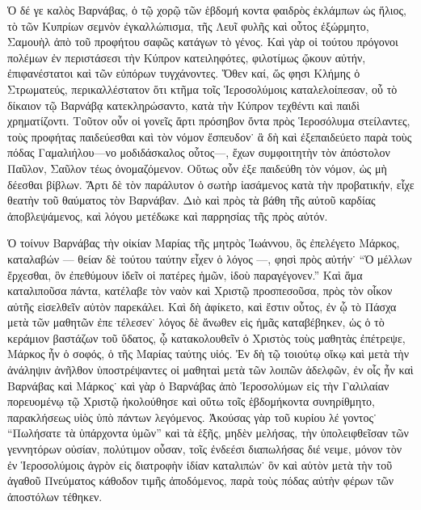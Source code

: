 Ὁ δέ γε καλὸς Βαρνάβας, ὁ τῷ χορῷ τῶν ἑβδομή%
κοντα φαιδρὸς ἐκλάμπων ὡς ἥλιος, τὸ τῶν Κυπρίων
σεμνὸν ἐγκαλλώπισμα, τῆς Λευῖ φυλῆς καὶ οὗτος
ἐξώρμητο, Σαμουὴλ ἀπὸ τοῦ προφήτου σαφῶς κατάγων
τὸ γένος. Καὶ γὰρ οἱ τούτου πρόγονοι πολέμων ἐν
περιστάσεσι τὴν Κύπρον κατειληφότες, φιλοτίμως ᾤκουν
αὐτήν, ἐπιφανέστατοι καὶ τῶν εὐπόρων τυγχάνοντες. Ὅθεν
καί, ὥς φησι Κλήμης ὁ Στρωματεύς, περικαλλέστατον
ὅτι κτῆμα τοῖς Ἱεροσολύμοις καταλελοίπεσαν, οὗ τὸ
δίκαιον τῷ Βαρνάβᾳ κατεκληρώσαντο, κατὰ τὴν Κύπρον
τεχθέντι καὶ παιδὶ χρηματίζοντι. Τοῦτον οὖν οἱ γονεῖς
ἄρτι πρόσηβον ὄντα πρὸς Ἱεροσόλυμα στείλαντες, τοὺς
προφήτας παιδεύεσθαι καὶ τὸν νόμον ἔσπευδον˙ ἃ δὴ
καὶ ἐξεπαιδεύετο παρὰ τοὺς πόδας Γαμαλιήλου---νο%
μοδιδάσκαλος οὗτος---, ἔχων συμφοιτητὴν τὸν ἀπόστολον
Παῦλον, Σαῦλον τέως ὀνομαζόμενον. Οὕτως οὗν ἐξε%
παιδεύθη τὸν νόμον, ὡς μὴ δέεσθαι βίβλων. Ἄρτι δὲ
τὸν παράλυτον ὁ σωτὴρ ἰασάμενος κατὰ τὴν προβατικήν,
εἶχε θεατὴν τοῦ θαύματος τὸν Βαρνάβαν. Διὸ καὶ πρὸς
τὰ βάθη τῆς αὐτοῦ καρδίας ἀποβλεψάμενος, καὶ λόγου
μετέδωκε καὶ παρρησίας τῆς πρὸς αὐτόν.

Ὁ τοίνυν Βαρνάβας τὴν οἰκίαν Μαρίας τῆς μητρὸς
Ἰωάννου, ὃς ἐπελέγετο Μάρκος, καταλαβών --- θείαν δὲ
τούτου ταύτην εἶχεν ὁ λόγος ---, φησὶ πρὸς αὐτήν˙ \enquote{Ὁ
μέλλων ἔρχεσθαι, ὃν ἐπεθύμουν ἰδεῖν οἱ πατέρες ἡμῶν,
ἰδοὺ παραγέγονεν.} Καὶ ἅμα καταλιποῦσα πάντα, κατέλαβε
τὸν ναὸν καὶ Χριστῷ προσπεσοῦσα, πρὸς τὸν οἶκον
αὐτῆς εἰσελθεῖν αὐτὸν παρεκάλει. Καὶ δὴ ἀφίκετο, καὶ
ἔστιν οὗτος, ἐν ᾧ τὸ Πάσχα μετὰ τῶν μαθητῶν ἐπε%
τέλεσεν˙ λόγος δὲ ἄνωθεν εἰς ἡμᾶς καταβέβηκεν, ὡς
ὁ τὸ κεράμιον βαστάζων τοῦ ὕδατος, ᾧ κατακολουθεῖν
ὁ Χριστὸς τοὺς μαθητὰς ἐπέτρεψε, Μάρκος ἦν ὁ σοφός,
ὁ τῆς Μαρίας ταύτης υἱός. Ἐν δὴ τῷ τοιούτῳ οἴκῳ
καὶ μετὰ τὴν ἀνάληψιν ἀνῆλθον ὑποστρέψαντες οἱ μαθηταὶ
μετὰ τῶν λοιπῶν ἀδελφῶν, ἐν οἷς ἦν καὶ Βαρνάβας καὶ
Μάρκος˙ καὶ γὰρ ὁ Βαρνάβας ἀπὸ Ἱεροσολύμων εἰς
τὴν Γαλιλαίαν πορευομένῳ τῷ Χριστῷ ἠκολούθησε καὶ
οὕτω τοῖς ἑβδομήκοντα συνηρίθμητο, παρακλήσεως υἱὸς
ὑπὸ πάντων λεγόμενος. Ἀκούσας γὰρ τοῦ κυρίου λέ%
γοντος˙ \enquote{Πωλήσατε τὰ ὑπάρχοντα ὑμῶν} καὶ τὰ ἑξῆς,
μηδὲν μελήσας, τὴν ὑπολειφθεῖσαν τῶν γεννητόρων
οὐσίαν, πολύτιμον οὖσαν, τοῖς ἐνδεέσι διαπωλήσας διέ%
νειμε, μόνον τὸν ἐν Ἱεροσολύμοις ἀγρὸν εἰς διατροφὴν
ἰδίαν καταλιπών˙ ὃν καὶ αὐτὸν μετὰ τὴν τοῦ ἀγαθοῦ
Πνεύματος κάθοδον τιμῆς ἀποδόμενος, παρὰ τοὺς πόδας
αὐτὴν φέρων τῶν ἀποστόλων τέθηκεν.


